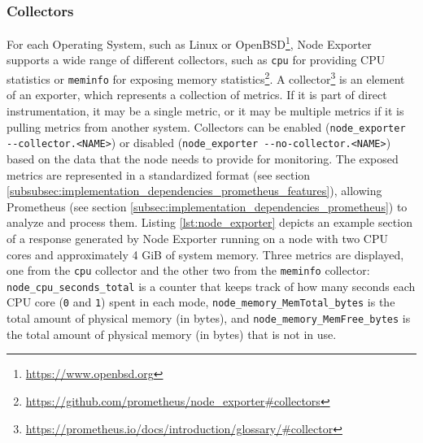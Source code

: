 \subsubsection{Collectors}
\label{subsubsec:implementation_dependencies_node_exporter-collectors}

For each Operating System, such as Linux or OpenBSD\footnote{\url{https://www.openbsd.org}},
Node Exporter supports a wide range of different collectors, such as \texttt{cpu}
for providing CPU statistics or \texttt{meminfo} for exposing memory statistics\footnote{\url{https://github.com/prometheus/node_exporter\#collectors}}.
A collector\footnote{\url{https://prometheus.io/docs/introduction/glossary/\#collector}}
is an element of an exporter, which represents a collection of metrics. If it is
part of direct instrumentation, it may be a single metric, or it may be multiple
metrics if it is pulling metrics from another system. Collectors can be enabled (\lstinline[language=shell,
basicstyle=\ttfamily, alsoletter={_, -, ., <, >}, morekeywords={[2]{node_exporter}},
morekeywords={[3]{--collector.<NAME>}}]{node_exporter --collector.<NAME>}) or disabled
(\lstinline[language=shell, basicstyle=\ttfamily, alsoletter={_, -, ., <, >}, morekeywords={[2]{node_exporter}},
morekeywords={[3]{--no-collector.<NAME>}}]{node_exporter --no-collector.<NAME>})
based on the data that the node needs to provide for monitoring. The exposed
metrics are represented in a standardized format (see section \ref{subsubsec:implementation_dependencies_prometheus_features}),
allowing Prometheus (see section
\ref{subsec:implementation_dependencies_prometheus}) to analyze and process them.
Listing \ref{lst:node_exporter} depicts an example section of a response
generated by Node Exporter running on a node with two CPU cores and
approximately 4 GiB of system memory. Three metrics are displayed, one from the
\texttt{cpu} collector and the other two from the \texttt{meminfo} collector: \texttt{node\_cpu\_seconds\_total}
is a counter that keeps track of how many seconds each CPU core (\texttt{0} and
\texttt{1}) spent in each mode, \texttt{node\_memory\_MemTotal\_bytes} is the
total amount of physical memory (in bytes), and \texttt{node\_memory\_MemFree\_bytes}
is the total amount of physical memory (in bytes) that is not in use.

